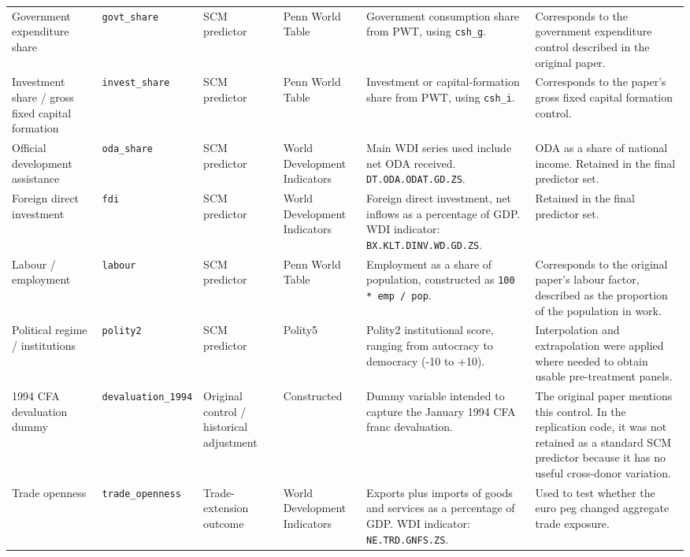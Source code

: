 \documentclass[a4paper]{article}
\begin{document}
\begin{landscape}
\begin{longtable}{P{3cm}P{3cm}P{3cm}P{3cm}P{4.4cm}P{5.2cm}}
Government expenditure share
& \texttt{govt\_share}
& SCM predictor
& Penn World Table
& Government consumption share from PWT, using \texttt{csh\_g}.
& Corresponds to the government expenditure control described in the original paper. \\

Investment share / gross fixed capital formation
& \texttt{invest\_share}
& SCM predictor
& Penn World Table
& Investment or capital-formation share from PWT, using \texttt{csh\_i}.
& Corresponds to the paper's gross fixed capital formation control. \\

Official development assistance
& \texttt{oda\_share}
& SCM predictor
& World Development Indicators
& Main WDI series used include net ODA received. \texttt{DT.ODA.ODAT.GD.ZS}.
& ODA as a share of national income. Retained in the final predictor set.\\

Foreign direct investment
& \texttt{fdi}
& SCM predictor
& World Development Indicators
& Foreign direct investment, net inflows as a percentage of GDP. WDI indicator: \texttt{BX.KLT.DINV.WD.GD.ZS}.
& Retained in the final predictor set. \\

Labour / employment
& \texttt{labour}
& SCM predictor
& Penn World Table
& Employment as a share of population, constructed as \texttt{100 * emp / pop}.
& Corresponds to the original paper's labour factor, described as the proportion of the population in work. \\

Political regime / institutions
& \texttt{polity2}
& SCM predictor
& Polity5
& Polity2 institutional score, ranging from autocracy to democracy (-10 to +10).
& Interpolation and extrapolation were applied where needed to obtain usable pre-treatment panels. \\

1994 CFA devaluation dummy
& \texttt{devaluation\_1994}
& Original control / historical adjustment
& Constructed
& Dummy variable intended to capture the January 1994 CFA franc devaluation.
& The original paper mentions this control. In the replication code, it was not retained as a standard SCM predictor because it has no useful cross-donor variation. \\

Trade openness
& \texttt{trade\_openness}
& Trade-extension outcome
& World Development Indicators
& Exports plus imports of goods and services as a percentage of GDP. WDI indicator: \texttt{NE.TRD.GNFS.ZS}.
& Used to test whether the euro peg changed aggregate trade exposure. \\


\end{longtable}
\end{landscape}
\end{document}
